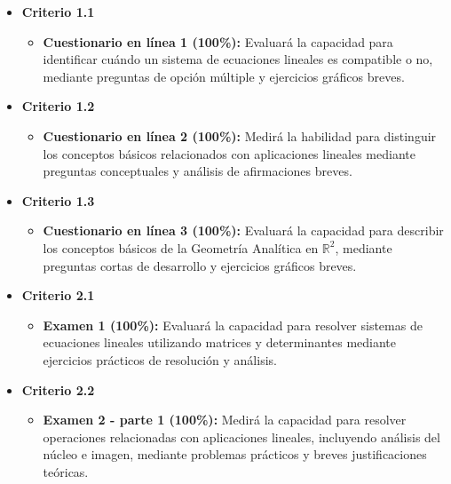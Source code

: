 \documentclass[a4,11pt]{aleph-notas}
\begin{document}
\begin{itemize}[leftmargin=*]
    \item \textbf{Criterio 1.1}
        \begin{itemize}[leftmargin=*]
            \item \textbf{Cuestionario en línea 1 (100\%):} Evaluará la capacidad para identificar cuándo un sistema de ecuaciones lineales es compatible o no, mediante preguntas de opción múltiple y ejercicios gráficos breves.
        \end{itemize}
        
    \item \textbf{Criterio 1.2}
        \begin{itemize}[leftmargin=*]
            \item \textbf{Cuestionario en línea 2 (100\%):} Medirá la habilidad para distinguir los conceptos básicos relacionados con aplicaciones lineales mediante preguntas conceptuales y análisis de afirmaciones breves.
        \end{itemize}
        
    \item \textbf{Criterio 1.3}
        \begin{itemize}[leftmargin=*]
            \item \textbf{Cuestionario en línea 3 (100\%):} Evaluará la capacidad para describir los conceptos básicos de la Geometría Analítica en \( \mathbb{R}^2 \), mediante preguntas cortas de desarrollo y ejercicios gráficos breves.
        \end{itemize}

    \item \textbf{Criterio 2.1}
        \begin{itemize}[leftmargin=*]
            \item \textbf{Examen 1 (100\%):} Evaluará la capacidad para resolver sistemas de ecuaciones lineales utilizando matrices y determinantes mediante ejercicios prácticos de resolución y análisis.
        \end{itemize}

    \item \textbf{Criterio 2.2}
        \begin{itemize}[leftmargin=*]
            \item \textbf{Examen 2 - parte 1 (100\%):} Medirá la capacidad para resolver operaciones relacionadas con aplicaciones lineales, incluyendo análisis del núcleo e imagen, mediante problemas prácticos y breves justificaciones teóricas.
        \end{itemize}
    

\end{itemize}
\end{document}
